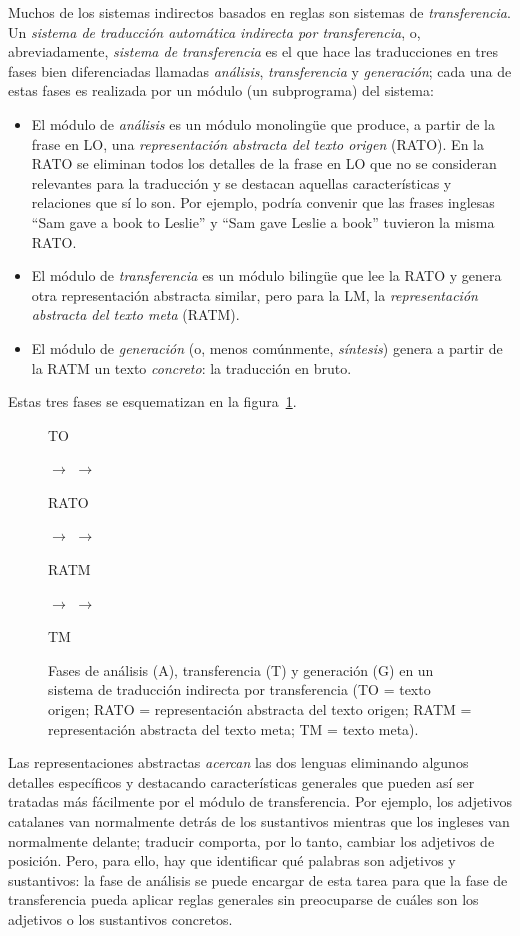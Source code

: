 Muchos de los sistemas indirectos basados en reglas son sistemas de \emph{transferencia}. Un \emph{sistema de traducción automática indirecta por transferencia}, o, abreviadamente, \emph{sistema de transferencia} es el que hace las traducciones en tres fases bien diferenciadas llamadas \emph{análisis}, \emph{transferencia} y \emph{generación}; cada una de estas fases es realizada por un módulo (un subprograma) del sistema: \begin{itemize} \item El módulo de \emph{análisis} es un módulo monolingüe que produce, a partir de la frase en LO, una \emph{representación abstracta del texto origen} (RATO). En la RATO se eliminan todos los detalles de la frase en LO que no se consideran relevantes para la traducción y se destacan aquellas características y relaciones que sí lo son. Por ejemplo, podría convenir que las frases inglesas ``Sam gave a book to Leslie'' y ``Sam gave Leslie a book'' \citep{arnold93j} tuvieron la misma RATO. \item El módulo de \emph{transferencia} es un módulo bilingüe que lee la RATO y genera otra representación abstracta similar, pero para la LM, la \emph{representación abstracta del texto meta} (RATM). \item El módulo de \emph{generación} (o, menos comúnmente, \emph{síntesis}) genera a partir de la RATM un texto \emph{concreto}: la traducción en bruto. \end{itemize} Estas tres fases se esquematizan en la figura~\ref{fg:transfer}. 

\begin{figure} \begin{center} \parbox{0.5cm}{TO} $\to$  $\to$ \parbox{1.0cm}{RATO} $\to$  $\to$ \parbox{1.25cm}{RATM} $\to$  $\to$ \parbox{0.5cm}{TM} \end{center} \caption{Fases de análisis (A), transferencia (T) y generación (G) en un sistema de traducción indirecta por transferencia (TO = texto origen; RATO = representación abstracta del texto origen; RATM = representación abstracta del texto meta; TM = texto meta).} \label{fg:transfer} \end{figure} 

Las representaciones abstractas \emph{acercan} las dos lenguas eliminando algunos detalles específicos y destacando características generales que pueden así ser tratadas más fácilmente por el módulo de transferencia. Por ejemplo, los adjetivos catalanes van normalmente detrás de los sustantivos mientras que los ingleses van normalmente delante; traducir comporta, por lo tanto, cambiar los adjetivos de posición. Pero, para ello, hay que identificar qué palabras son adjetivos y sustantivos: la fase de análisis se puede encargar de esta tarea para que la fase de transferencia pueda aplicar reglas generales sin preocuparse de cuáles son los adjetivos o los sustantivos concretos. 

